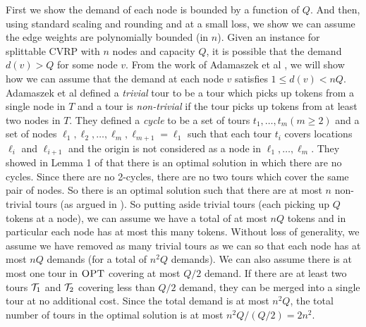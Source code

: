 \documentclass[twoside,leqno]{article}
\newcommand{\calT}{{\cal T}}
\newcommand{\OPT}{\mbox{\sc OPT}}
\begin{document}
 First we show the demand of each node is bounded by a function of $Q$. And then,
using standard scaling and rounding and at a small loss, we show we can assume the edge weights are polynomially bounded (in $n$).   Given an instance for splittable CVRP with $n$ nodes and capacity $Q$, it is possible that the demand $d(v) > Q$ for some node $v$. From the work of Adamaszek et al \cite{AdamaszekCL09}, we will show how we can assume that the demand at each node $v$ satisfies $1 \le d(v) < nQ$. Adamaszek et al \cite{AdamaszekCL09} defined a \emph{trivial} tour to be a tour which picks up tokens from a single node in $T$ and a tour is \emph{non-trivial} if the tour picks up tokens from at least two nodes in $T$. They defined a \emph{cycle} to be a set of tours $t_1,\ldots, t_m (m \ge 2)$ and a set of nodes $\ell_1, \ell_2, \ldots, \ell_m, \ell_{m+1} = \ell_1$ such that each tour $t_i$ covers locations $\ell_i$ and $\ell_{i+1}$ and the origin is not considered as a node in $\ell_1, \ldots, \ell_m$.  They showed in Lemma 1 of \cite{AdamaszekCL09} that there is an optimal solution in which there are no cycles. Since there are no 2-cycles, there are no two tours which cover the same pair of nodes. So there is an optimal solution such that there are at most $n$ non-trivial tours (as argued in \cite{AdamaszekCL09}). So putting aside trivial tours (each picking up $Q$ tokens at a node), we can assume we have a total of at most $nQ$ tokens and in particular each node has at most this many tokens. Without loss of generality, we assume we have removed as many trivial tours as we can so that each node has at most $nQ$ demands (for a total of $n^2Q$ demands).
We can also assume there is at most one tour in $\OPT$ covering at most $Q/2$ demand. If there are at least two tours $\calT_1$ and $\calT_2$ covering less than $Q/2$ demand, they can be merged into a single tour at no additional cost. Since the total demand is at most $n^2Q$, the total number of tours in the optimal solution is at most $n^2Q/(Q/2) = 2n^2$. 
  
\end{document}
